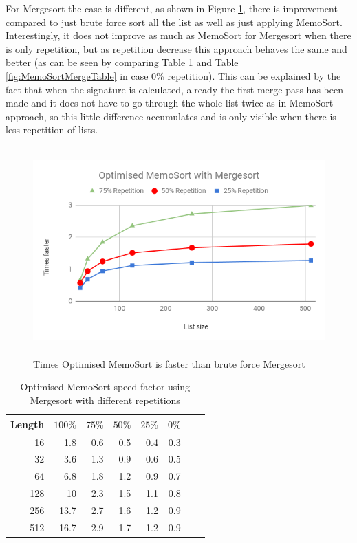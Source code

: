 \documentclass[a4paper,12pt]{article}
\begin{document}
For Mergesort the case is different, as shown in Figure \ref{fig:OptMemoSortMergeGraph}, there is improvement compared to just brute force sort all the list as well as just applying MemoSort. Interestingly, it does not improve as much as MemoSort for Mergesort when there is only repetition, but as repetition decrease this approach behaves the same and better (as can be seen by comparing Table \ref{fig:OptMemoSortMergeTable} and Table \ref{fig:MemoSortMergeTable} in case 0\% repetition). This can be explained by the fact that when the signature is calculated, already the first merge pass has been made and it does not have to go through the whole list twice as in MemoSort approach, so this little difference accumulates and is only visible when there is less repetition of lists.


\begin{figure}[H]
    \centering
    \includegraphics[height=8cm,keepaspectratio]{./images/OptMemoSortMerge.png}
    \caption{Times Optimised MemoSort is faster than brute force Mergesort}
    \label{fig:OptMemoSortMergeGraph}
\end{figure}


\begin{table}[H]
\centering
\begin{tabular}{|r|r|r|r|r|r|r|r|}   \hline
	{Length}  & {$100\%$} & {$75\%$} & {$50\%$} & {$25\%$} & {$0\%$} \\  \hline
	16 &1.8&0.6& 0.5 &0.4&0.3\\ 
	32 &3.6&1.3 & 0.9&0.6&0.5\\ 
	64 &6.8 &1.8&1.2&0.9&0.7\\ 
	128 &10&2.3&1.5&1.1&0.8\\ 
	256 &13.7&2.7&1.6&1.2&0.9\\ 
	512 & 16.7&2.9&1.7&1.2&0.9\\  \hline
\end{tabular}
\caption{Optimised MemoSort speed factor using Mergesort with different repetitions}
\label{fig:OptMemoSortMergeTable}
\end{table}
\end{document}
